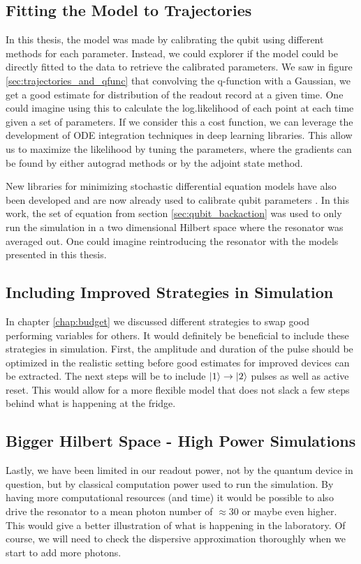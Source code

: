 \subsection{Fitting the Model to Trajectories}
In this thesis, the model was made by calibrating the qubit using different methods for each parameter. Instead, we could explorer if the model could be directly fitted to the data to retrieve the calibrated parameters. We saw in figure \ref{sec:trajectories_and_qfunc} that convolving the q-function with a Gaussian, we get a good estimate for distribution of the readout record at a given time. One could imagine using this to calculate the log.likelihood of each point at each time given a set of parameters. If we consider this a cost function, we can leverage the development of ODE integration techniques in deep learning libraries. This allow us to maximize the likelihood by tuning the parameters, where the gradients can be found by either autograd methods or by the adjoint state method. \cite{allaire_review_2015}

New libraries for minimizing stochastic differential equation models have also been developed and are now already used to calibrate qubit parameters \cite{genois_quantum-tailored_2021}. In this work, the set of equation from section \ref{sec:qubit_backaction} was used to only run the simulation in a two dimensional Hilbert space where the resonator was averaged out. One could imagine reintroducing the resonator with the models presented in this thesis.


\subsection{Including Improved Strategies in Simulation} 
In chapter \ref{chap:budget} we discussed different strategies to swap good performing variables for others. It would definitely be beneficial to include these strategies in simulation. First, the amplitude and duration of the pulse should be optimized in the realistic setting before good estimates for improved devices can be extracted. The next steps will be to include $\ket{1}\to\ket{2}$ pulses as well as active reset. This would allow for a more flexible model that does not slack a few steps behind what is happening at the fridge. 

\subsection{Bigger Hilbert Space - High Power Simulations}
Lastly, we have been limited in our readout power, not by the quantum device in question, but by classical computation power used to run the simulation. By having more computational resources (and time) it would be possible to also drive the resonator to a mean photon number of $\approx30$ or maybe even higher. This would give a better illustration of what is happening in the laboratory. Of course, we will need to check the dispersive approximation thoroughly when we start to add more photons.   